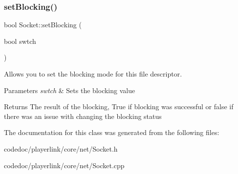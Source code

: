 \subsubsection{\texorpdfstring{set\+Blocking()}{setBlocking()}}
{\footnotesize\ttfamily bool Socket\+::set\+Blocking (\begin{DoxyParamCaption}\item[{bool}]{swtch }\end{DoxyParamCaption})}



Allows you to set the blocking mode for this file descriptor. 


\begin{DoxyParams}{Parameters}
{\em swtch} & Sets the blocking value \\
\hline
\end{DoxyParams}
\begin{DoxyReturn}{Returns}
The result of the blocking, True if blocking was successful or false if there was an issue with changing the blocking status 
\end{DoxyReturn}


The documentation for this class was generated from the following files\+:\begin{DoxyCompactItemize}
\item 
codedoc/playerlink/core/net/Socket.\+h\item 
codedoc/playerlink/core/net/Socket.\+cpp\end{DoxyCompactItemize}
